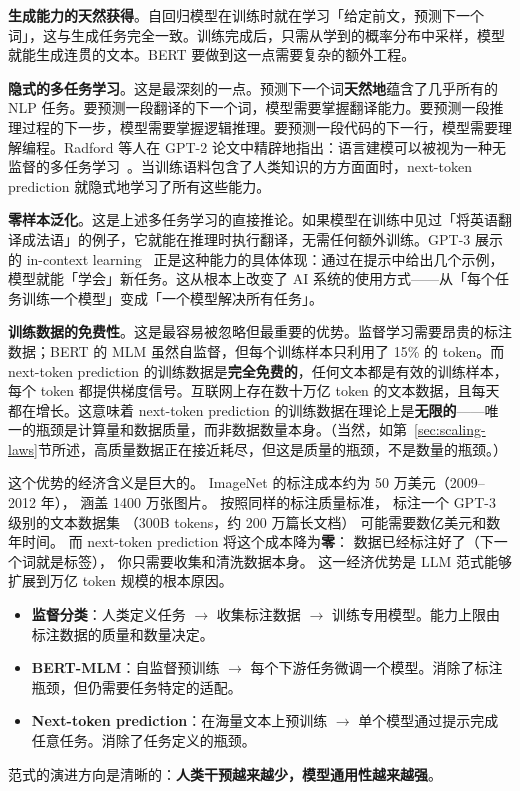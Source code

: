 \textbf{生成能力的天然获得}。自回归模型在训练时就在学习「给定前文，预测下一个词」，这与生成任务完全一致。训练完成后，只需从学到的概率分布中采样，模型就能生成连贯的文本。BERT 要做到这一点需要复杂的额外工程。

\textbf{隐式的多任务学习}。这是最深刻的一点。预测下一个词\textbf{天然地}蕴含了几乎所有的 NLP 任务。要预测一段翻译的下一个词，模型需要掌握翻译能力。要预测一段推理过程的下一步，模型需要掌握逻辑推理。要预测一段代码的下一行，模型需要理解编程。Radford 等人在 GPT-2 论文中精辟地指出：语言建模可以被视为一种无监督的多任务学习~\cite{radford2019gpt2}。当训练语料包含了人类知识的方方面面时，next-token prediction 就隐式地学习了所有这些能力。

\textbf{零样本泛化}。这是上述多任务学习的直接推论。如果模型在训练中见过「将英语翻译成法语」的例子，它就能在推理时执行翻译，无需任何额外训练。GPT-3 展示的 in-context learning~\cite{brown2020gpt3} 正是这种能力的具体体现：通过在提示中给出几个示例，模型就能「学会」新任务。这从根本上改变了 AI 系统的使用方式——从「每个任务训练一个模型」变成「一个模型解决所有任务」。

\textbf{训练数据的免费性}。这是最容易被忽略但最重要的优势。监督学习需要昂贵的标注数据；BERT 的 MLM 虽然自监督，但每个训练样本只利用了 15\% 的 token。而 next-token prediction 的训练数据是\textbf{完全免费的}，任何文本都是有效的训练样本，每个 token 都提供梯度信号。互联网上存在数十万亿 token 的文本数据，且每天都在增长。这意味着 next-token prediction 的训练数据在理论上是\textbf{无限的}——唯一的瓶颈是计算量和数据质量，而非数据数量本身。（当然，如第~\ref{sec:scaling-laws}节所述，高质量数据正在接近耗尽，但这是质量的瓶颈，不是数量的瓶颈。）

这个优势的经济含义是巨大的。
ImageNet 的标注成本约为 50 万美元（2009--2012 年），
涵盖 1400 万张图片。
按照同样的标注质量标准，
标注一个 GPT-3 级别的文本数据集
（300B tokens，约 200 万篇长文档）
可能需要数亿美元和数年时间。
而 next-token prediction 将这个成本降为\textbf{零}：
数据已经标注好了（下一个词就是标签），
你只需要收集和清洗数据本身。
这一经济优势是 LLM 范式能够扩展到万亿 token 规模的根本原因。

\begin{keybox}[两种范式的本质区别]
\begin{itemize}[noitemsep]
  \item \textbf{监督分类}：人类定义任务 $\to$ 收集标注数据 $\to$ 训练专用模型。能力上限由标注数据的质量和数量决定。
  \item \textbf{BERT-MLM}：自监督预训练 $\to$ 每个下游任务微调一个模型。消除了标注瓶颈，但仍需要任务特定的适配。
  \item \textbf{Next-token prediction}：在海量文本上预训练 $\to$ 单个模型通过提示完成任意任务。消除了任务定义的瓶颈。
\end{itemize}
范式的演进方向是清晰的：\textbf{人类干预越来越少，模型通用性越来越强}。
\end{keybox}

